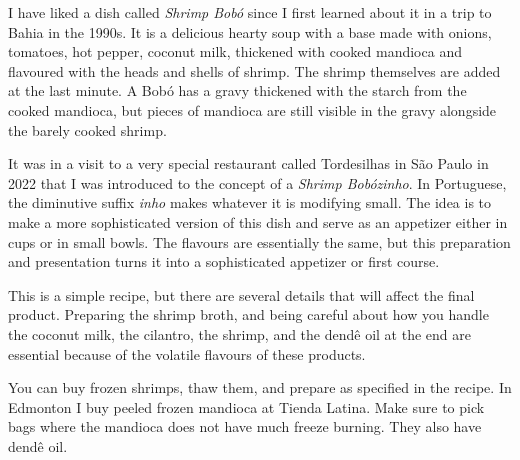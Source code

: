 \documentclass[11pt,letterpaper]{article}
\begin{document}



I have liked a dish called {\it Shrimp Bob\'o} since I first learned about it in a trip to Bahia in the 1990s. It is a delicious hearty soup with a base made with onions, tomatoes, hot pepper, coconut milk, thickened with cooked mandioca and flavoured with the heads and shells of shrimp. The shrimp themselves are added at the last minute. A Bob\'o has a gravy thickened with the starch from the cooked mandioca, but pieces of mandioca are still visible in the gravy alongside the barely cooked shrimp.

It was in a visit to a very special restaurant called Tordesilhas in S\~ao Paulo in 2022 that I was introduced to the concept of a {\it Shrimp Bob\'ozinho}. In Portuguese, the diminutive suffix {\it inho} makes whatever it is modifying small. The idea is to make a more sophisticated version of this dish and serve as an appetizer either in cups or in small bowls. The flavours are essentially the same, but this preparation and presentation turns it into a sophisticated appetizer or first course.

This is a simple recipe, but there are several details that will affect the final product. Preparing the shrimp broth, and being careful about how you handle the coconut milk, the cilantro, the shrimp, and the dend\^e oil at the end are essential because of the volatile flavours of these products.

You can buy frozen shrimps, thaw them, and prepare as specified in the recipe. In Edmonton I buy peeled frozen mandioca at Tienda Latina. Make sure to pick bags where the mandioca does not have much freeze burning. They also have dend\^e oil.
 
 
\vspace{0.3in}
\end{document}

